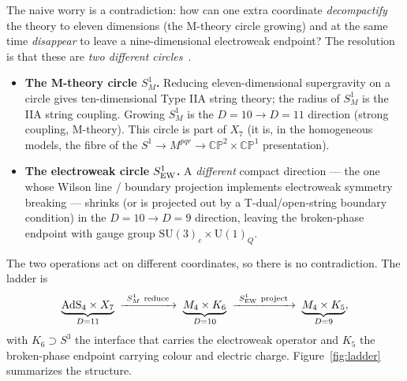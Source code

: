 \documentclass[11pt]{article}
\theoremstyle{plain}
\theoremstyle{definition}
\newcommand{\SU}{\mathrm{SU}}
\newcommand{\U}{\mathrm{U}}
\newcommand{\AdS}{\mathrm{AdS}}
\begin{document}
The naive worry is a contradiction: how can one extra coordinate
\emph{decompactify} the theory to eleven dimensions (the M-theory circle
growing) and at the same time \emph{disappear} to leave a nine-dimensional
electroweak endpoint? The resolution is that these are \emph{two different
circles}~\cite{Witten1995}.

\begin{itemize}
\item \textbf{The M-theory circle $S^1_M$.} Reducing eleven-dimensional
supergravity on a circle gives ten-dimensional Type IIA string theory; the
radius of $S^1_M$ is the IIA string coupling. Growing $S^1_M$ is the
$D=10\to D=11$ direction (strong coupling, M-theory). This circle is part
of $X_7$ (it is, in the homogeneous models, the fibre of the
$S^1\to M^{pqr}\to \mathbb{CP}^2\times\mathbb{CP}^1$ presentation).
\item \textbf{The electroweak circle $S^1_{\rm EW}$.} A \emph{different}
compact direction --- the one whose Wilson line / boundary projection
implements electroweak symmetry breaking --- shrinks (or is projected out
by a T-dual/open-string boundary condition) in the $D=10\to D=9$ direction,
leaving the broken-phase endpoint with gauge group $\SU(3)_c\times\U(1)_Q$.
\end{itemize}

The two operations act on different coordinates, so there is no
contradiction. The ladder is
\begin{equation}
\underbrace{\AdS_4\times X_7}_{D=11}
\;\xrightarrow{\ S^1_M\ \text{reduce}\ }\;
\underbrace{M_4\times K_6}_{D=10}
\;\xrightarrow{\ S^1_{\rm EW}\ \text{project}\ }\;
\underbrace{M_4\times K_5}_{D=9},
\end{equation}
with $K_6\supset S^3$ the interface that carries the electroweak operator
and $K_5$ the broken-phase endpoint carrying colour and electric charge.
Figure~\ref{fig:ladder} summarizes the structure.
\end{document}
